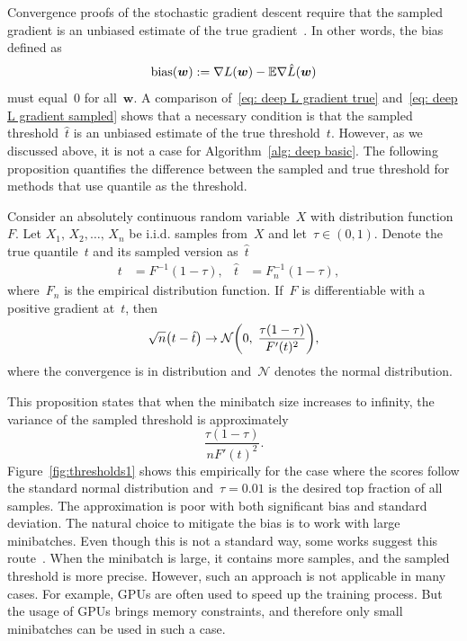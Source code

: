 Convergence proofs of the stochastic gradient descent require that the sampled gradient is an unbiased estimate of the true gradient~\cite{bottou2018optimization}. In other words, the bias defined as 
\begin{equation}\label{eq:defin_bias}
  \operatorname{bias}(\bm{w}) := \nabla L(\bm{w}) - \mathbb{E} \nabla \hat{L}(\bm{w})
\end{equation}
must equal~$0$ for all~$\bm{w}$. A comparison of~\eqref{eq: deep L gradient true} and~\eqref{eq: deep L gradient sampled} shows that a necessary condition is that the sampled threshold~$\hat{t}$ is an unbiased estimate of the true threshold~$t$. However, as we discussed above, it is not a case for Algorithm~\ref{alg: deep basic}. The following proposition quantifies the difference between the sampled and true threshold for methods that use quantile as the threshold.

\begin{proposition}\label{proposition:bound}
  Consider an absolutely continuous random variable~$X$ with distribution function~$F.$ Let $X_1,\, X_2, \ldots, \, X_n$ be i.i.d. samples from~$X$ and let~$\tau \in (0,1).$ Denote the true quantile~$t$ and its sampled version as~$\hat{t}$
  \begin{align*}
    t & = F^{-1}(1 - \tau), &
    \hat{t} & = F_{n}^{-1}(1 - \tau), &
  \end{align*}
  where~$F_{n}$ is the empirical distribution function. If~$F$ is differentiable with a positive gradient at~$t$, then
  \begin{equation*}
    \sqrt{n}\Brac{t - \hat{t}} \rightarrow \mathcal{N} \Brac{0, \; \frac{\tau(1-\tau)}{F'(t)^2}},
  \end{equation*}
  where the convergence is in distribution and~$\mathcal{N}$ denotes the normal distribution.
\end{proposition}

This proposition states that when the minibatch size increases to infinity, the variance of the sampled threshold is approximately
\begin{equation*}
  \frac{\tau(1-\tau)}{nF'(t)^2}.
\end{equation*}
Figure~\ref{fig:thresholds1} shows this empirically for the case where the scores follow the standard normal distribution and~$\tau=0.01$ is the desired top fraction of all samples. The approximation is poor with both significant bias and standard deviation. The natural choice to mitigate the bias is to work with large minibatches. Even though this is not a standard way, some works suggest this route~\cite{you2019large}. When the minibatch is large, it contains more samples, and the sampled threshold is more precise. However, such an approach is not applicable in many cases. For example, GPUs are often used to speed up the training process. But the usage of GPUs brings memory constraints, and therefore only small minibatches can be used in such a case.

